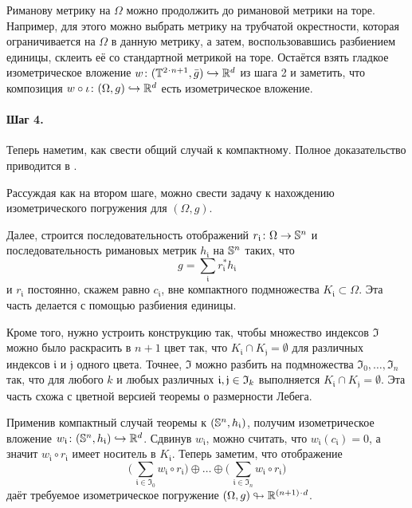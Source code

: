 Риманову метрику на $\Omega$ можно продолжить до римановой метрики на торе.
Например, для этого можно выбрать метрику на трубчатой окрестности, которая ограничивается на $\Omega$ в данную метрику, а затем, воспользовавшись разбиением единицы, склеить её со стандартной метрикой на торе.
Остаётся взять гладкое изометрическое вложение $w\colon (\TT^{2\cdot n+1}, \bar g) \hookrightarrow \RR^d$ из шага 2 и заметить, что композиция $w \circ \iota\colon(\Omega, g) \hookrightarrow \mathbb{R}^d$ есть изометрическое вложение.

\paragraph{Шаг 4.}
Теперь наметим, как свести общий случай к компактному.
Полное доказательство приводится в \cite[Часть D]{nash-1956-ru}.

Рассуждая как на втором шаге, можно свести задачу к нахождению изометрического погружения для $(\Omega,g)$.

Далее, строится последовательность отображений $r_{\mathfrak{i}}\colon\Omega \z\to \SSS^n$ и последовательность римановых метрик $h_{\mathfrak{i}}$ на $\mathbb{S}^n$ таких, что
\[g=\sum_{\mathfrak{i}} r_{\mathfrak{i}}^*h_{\mathfrak{i}}\]
и $r_{\mathfrak{i}}$ постоянно, скажем равно $c_{\mathfrak{i}}$, вне компактного подмножества $K_{\mathfrak{i}}\subset \Omega$.
Эта часть делается с помощью разбиения единицы.

Кроме того, нужно устроить конструкцию так, чтобы множество индексов $\mathfrak{I}$ можно было раскрасить в $n+1$ цвет так, что $K_{\mathfrak{i}}\cap K_{\mathfrak{j}}=\emptyset$ для различных индексов $\mathfrak{i}$ и $\mathfrak{j}$ одного цвета.
Точнее, $\mathfrak{I}$ можно разбить на подмножества $\mathfrak{I}_0, \dots, \mathfrak{I}_n$ так, что для любого $k$ и любых различных $\mathfrak{i}, \mathfrak{j} \z\in \mathfrak{I}_k$ выполняется
$K_{\mathfrak{i}} \cap K_{\mathfrak{j}} = \emptyset$.
Эта часть схожа с цветной версией теоремы о размерности Лебега.

Применив компактный случай теоремы к $(\mathbb{S}^n,h_{\mathfrak{i}})$, получим изометрическое вложение $w_{\mathfrak{i}}\colon(\mathbb{S}^n,h_{\mathfrak{i}})\hookrightarrow \mathbb{R}^d$.
Сдвинув $w_{\mathfrak{i}}$, можно считать, что $w_{\mathfrak{i}}(c_{\mathfrak{i}})=0$, а значит $w_{\mathfrak{i}}\circ r_{\mathfrak{i}}$ имеет носитель в $K_{\mathfrak{i}}$.
Теперь заметим, что отображение
\[\biggl(\,\sum_{\mathfrak{i}\in \mathfrak{I}_0}w_{\mathfrak{i}}\circ r_{\mathfrak{i}}\biggr)\oplus\dots\oplus
\biggl(\,\sum_{\mathfrak{i}\in \mathfrak{I}_n}w_{\mathfrak{i}}\circ r_{\mathfrak{i}}\biggr)\]
даёт требуемое изометрическое погружение $(\Omega,g)\looparrowright \RR^{(n+1)\cdot d}$.

